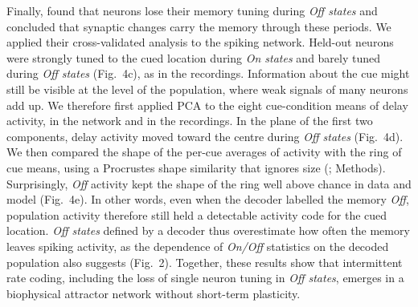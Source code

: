 \documentclass[11pt]{article}
\begin{document}
Finally, \citet{panichello2024} found that neurons lose their memory tuning during \emph{Off states} and concluded that synaptic changes carry the memory through these periods. We applied their cross-validated analysis to the spiking network. Held-out neurons were strongly tuned to the cued location during \emph{On states} and barely tuned during \emph{Off states} (Fig.~4c), as in the recordings. Information about the cue might still be visible at the level of the population, where weak signals of many neurons add up. We therefore first applied PCA to the eight cue-condition means of delay activity, in the network and in the recordings. In the plane of the first two components, delay activity moved toward the centre during \emph{Off states} (Fig.~4d). We then compared the shape of the per-cue averages of activity with the ring of cue means, using a Procrustes shape similarity that ignores size (\citealp{barbosa2025}; Methods). Surprisingly, \emph{Off} activity kept the shape of the ring well above chance in data and model (Fig.~4e). In other words, even when the decoder labelled the memory \emph{Off}, population activity therefore still held a detectable activity code for the cued location. \emph{Off states} defined by a decoder thus overestimate how often the memory leaves spiking activity, as the dependence of \emph{On/Off} statistics on the decoded population also suggests (Fig.~2). Together, these results show that intermittent rate coding, including the loss of single neuron tuning in \emph{Off states}, emerges in a biophysical attractor network without short-term plasticity.
\end{document}
